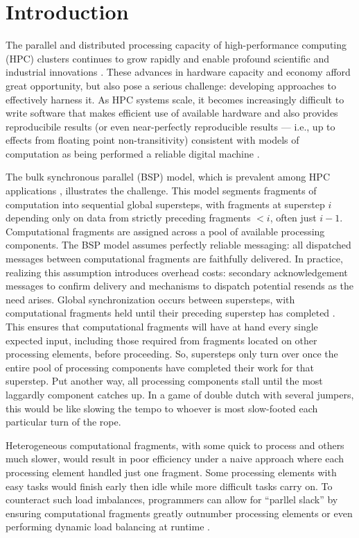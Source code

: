 \section{Introduction}

The parallel and distributed processing capacity of high-performance computing (HPC) clusters continues to grow rapidly and enable profound scientific and industrial innovations \citep{gagliardi2019international}.
These advances in hardware capacity and economy afford great opportunity, but also pose a serious challenge: developing approaches to effectively harness it.
As HPC systems scale, it becomes increasingly difficult to write software that makes efficient use of available hardware and also provides reproducibile results (or even near-perfectly reproducible results --- i.e., up to effects from floating point non-transitivity) consistent with models of computation as being performed a reliable digital machine \citep{heroux2014toward}.

The bulk synchronous parallel (BSP) model, which is prevalent among HPC applications \citep{dongarra2014applied}, illustrates the challenge.
This model segments fragments of computation into sequential global supersteps, with fragments at superstep $i$ depending only on data from strictly preceding fragments $<i$, often just $i-1$.
Computational fragments are assigned across a pool of available processing components.
The BSP model assumes perfectly reliable messaging: all dispatched messages between computational fragments are faithfully delivered.
In practice, realizing this assumption introduces overhead costs: secondary acknowledgement messages to confirm delivery and mechanisms to dispatch potential resends as the need arises.
Global synchronization occurs between supersteps, with computational fragments held until their preceding superstep has completed \citep{valiant1990bridging}.
This ensures that computational fragments will have at hand every single expected input, including those required from fragments located on other processing elements, before proceeding.
So, supersteps only turn over once the entire pool of processing components have completed their work for that superstep.
Put another way, all processing components stall until the most laggardly component catches up.
In a game of double dutch with several jumpers, this would be like slowing the tempo to whoever is most slow-footed each particular turn of the rope.

Heterogeneous computational fragments, with some quick to process and others much slower, would result in poor efficiency under a naive approach where each processing element handled just one fragment.
Some processing elements with easy tasks would finish early then idle while more difficult tasks carry on.
To counteract such load imbalances, programmers can allow for ``parllel slack'' by ensuring computational fragments greatly outnumber processing elements or even performing dynamic load balancing at runtime \citep{valiant1990bridging}.

